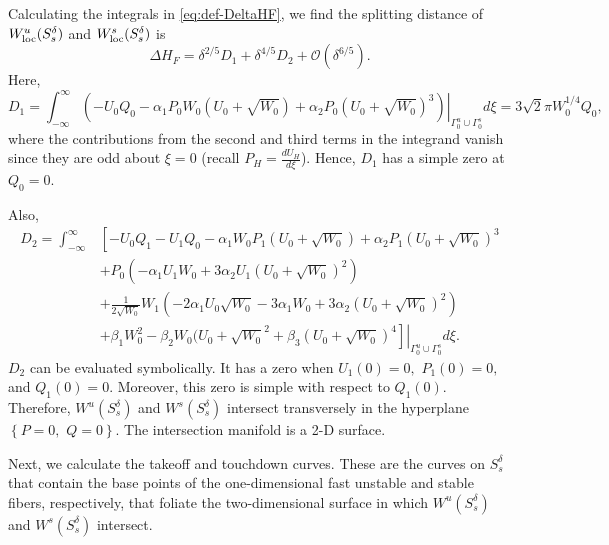 \documentclass[11pt]{article}
\numberwithin{equation}{section}
\begin{document}
Calculating the integrals in \eqref{eq:def-DeltaHF}, we find the splitting distance of $W^u_{\rm loc}(S_s^\delta)$ and $W^s_{\rm loc}(S_s^\delta)$ is 
\begin{equation}\label{eq:Delta_HF}
\Delta H_F = \delta^{2/5} D_1 + \delta^{4/5} D_2 + \mathcal{O}(\delta^{6/5}).
\end{equation}
Here,
\begin{equation}
D_1 = \int_{-\infty}^\infty \left. \left( -U_0 Q_0 -\alpha_1 P_0 W_0 (U_0 + \sqrt{W_0}) +\alpha_2 P_0 (U_0+\sqrt{W_0})^3 \right) \right\vert_{\Gamma_0^u \cup \Gamma_0^s} d\xi= 3\sqrt{2} \pi W_0^{1/4} Q_0,
\end{equation}
where the contributions from the second and third terms in the integrand vanish since they are odd about $\xi=0$ (recall $P_H=\tfrac{dU_H}{d\xi}$).
Hence, $D_1$ has a simple zero at $Q_0=0$.

Also,
\begin{equation}
\begin{split} 
D_2 = \int_{-\infty}^\infty 
&\left[ -U_0Q_1 - U_1 Q_0 -\alpha_1 W_0 P_1 (U_0 + \sqrt{W_0})
+\alpha_2 P_1 (U_0 + \sqrt{W_0})^3 \right. \\
&+P_0( -\alpha_1 U_1 W_0 + 3 \alpha_2 U_1 (U_0 +\sqrt{W_0})^2) \\
&+\frac{1}{2\sqrt{ W_0}} W_1( -2\alpha_1 U_0 \sqrt{W_0} -3\alpha_1 W_0 + 3\alpha_2 (U_0+\sqrt{W_0})^2) \\
&+\left. \left. \beta_1 W_0^2 -\beta_2 W_0 (U_0+\sqrt{W_0}^2 +\beta_3(U_0 + \sqrt{W_0})^4\right] \right\vert_{\Gamma_0^u \cup \Gamma_0^s} d\xi.
\end{split}
\end{equation}
$D_2$ can be evaluated symbolically. 
It has a zero when $U_1(0)=0,$
$P_1(0)=0,$ and
$Q_1(0)=0$.
Moreover, this zero is simple with respect to $Q_1(0)$.
Therefore, $W^u(S_s^\delta)$ and $W^s(S_s^\delta)$ intersect transversely in the hyperplane $\left\{ P=0, \, \, Q=0 \right\}.$
The intersection manifold is a 2-D surface.

Next, we calculate the takeoff and touchdown curves.
These are the curves on $S_s^\delta$ that contain the base points of the one-dimensional fast unstable and stable fibers, respectively, that foliate the two-dimensional surface in which $W^u(S_s^\delta)$ and $W^s(S_s^\delta)$ intersect.
\end{document}
